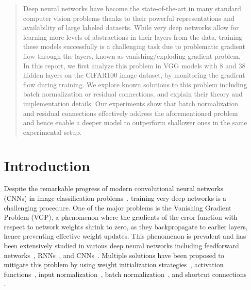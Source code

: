 \documentclass{article}
\begin{document}
 


\begin{abstract} 
Deep neural networks have become the state-of-the-art 
in many standard computer vision problems thanks to their powerful
representations and availability of large labeled datasets.
While very deep networks allow for learning more levels of abstractions in their layers from the data, training these models successfully is a challenging task due to problematic gradient flow through the layers, known as vanishing/exploding gradient problem.
In this report, we first analyze this problem in VGG models with 8 and 38 hidden layers on the CIFAR100 image dataset, by monitoring the gradient flow during training. 
We explore known solutions to this problem including batch normalization or residual connections, and explain their theory and implementation details. 
Our experiments show that batch normalization and residual connections effectively address the aforementioned problem and hence enable a deeper model to outperform shallower ones in the same experimental setup.
\end{abstract} 

\section{Introduction}
\label{sec:intro}
Despite the remarkable progress of modern convolutional neural networks (CNNs) in image classification problems~\cite{simonyan2014very, he2016deep}, training very deep networks is a challenging procedure.
One of the major problems is the Vanishing Gradient Problem (VGP), a phenomenon where the gradients of the error function with respect to network weights shrink to zero, as they backpropagate to earlier layers, hence preventing effective weight updates. 
This phenomenon is prevalent and has been extensively studied in various deep neural networks including feedforward  networks~\cite{glorot2010understanding},  RNNs~\cite{bengio1993problem}, and CNNs~\cite{he2016deep}. 
Multiple solutions have been proposed to mitigate this problem by using weight initialization strategies~\cite{glorot2010understanding},
activation functions~\cite{glorot2010understanding}, input normalization~\cite{bishop1995neural},
batch normalization~\cite{ioffe2015batch}, and shortcut connections \cite{he2016deep, huang2017densely}.
\end{document}
